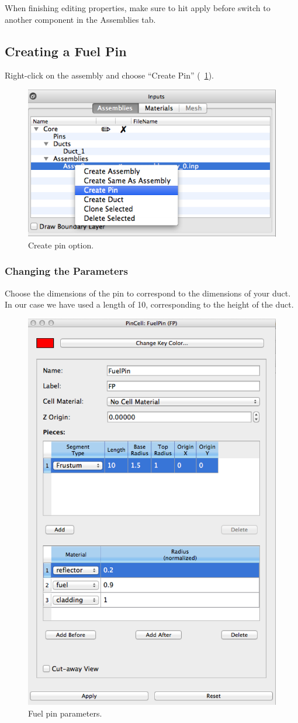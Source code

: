 \begin{commonerrors}
	When finishing editing properties, make sure to hit 
	apply before switch to another component in the Assemblies tab.
\end{commonerrors}

\clearpage

\subsection{Creating a Fuel Pin}

Right-click on the assembly and choose ``Create Pin'' (~\ref{fig:rectCreatePin}).

\begin{figure}[htb]
\begin{center}
\includegraphics[width=0.5\linewidth]{Images/rect-create-pin-option.png}
\caption{Create pin option.}
\label{fig:rectCreatePin}
\end{center}
\end{figure}

\subsubsection{Changing the Parameters}

Choose the dimensions of the pin to correspond to the dimensions of your duct.  In our case we have used a length of 10, corresponding to the height of the duct.

\begin{figure}[htb]
\begin{center}
\includegraphics[width=0.4\linewidth]{Images/rect-pin-params.png}
\caption{Fuel pin parameters.}
\label{fig:Rect5}
\end{center}
\end{figure}

